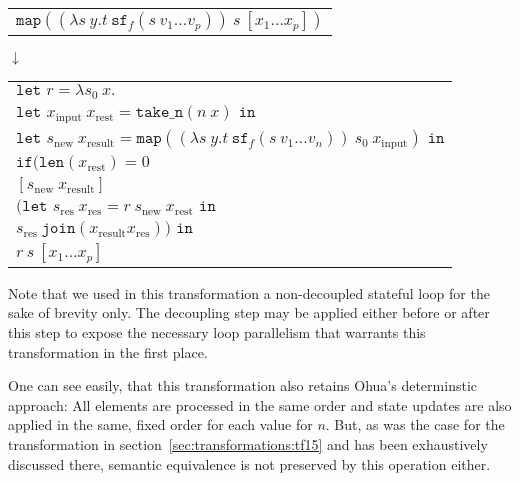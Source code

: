 \begin{center}
    \begin{tabular}{l}
        $\texttt{map} ((\lambda s\ y.t\ \texttt{sf}_f(s\ v_1 \dots v_p))\ s\ [x_1 \dots x_p])$\\
    \end{tabular}

    $\downarrow$

    \begin{tabular}{l}
        $\texttt{let } r = \lambda s_0\ x.$\\
        \hspace*{.3cm}$\texttt{let } x_\text{input}\ x_\text{rest} = \texttt{take\_n}( n\ x) \texttt{ in}$\\
        \hspace*{.6cm}$\texttt{let } s_\text{new}\ x_\text{result} = \texttt{map} ((\lambda s\ y.t\ \texttt{sf}_f(s\ v_1 \dots v_n))\ s_0 \ x_\text{input}) \texttt{ in}$\\
        \hspace*{.9cm}$\texttt{if} (\texttt{len} (x_\text{rest}) = 0$\\
        \hspace*{1.5cm}$[s_\text{new}\ x_\text{result}]$\\
        \hspace*{1.5cm}$(\texttt{let } s_\text{res}\ x_\text{res} = r\ s_\text{new} \ x_\text{rest} \texttt{ in}$\\
        \hspace*{1.8cm}$s_\text{res}\ \texttt{join} (x_\text{result} x_\text{res})) \texttt{ in}$\\
        \hspace*{.3cm}$r \ s \ [x_1 \dots x_p]$
    \end{tabular}
\end{center}

Note that we used in this transformation a non-decoupled stateful loop for the sake of brevity only.
The decoupling step may be applied either before or after this step to expose the necessary loop parallelism that warrants this transformation in the first place.

One can see easily, that this transformation also retains Ohua's determinstic approach: All elements are processed in the same order and state updates are also applied in the same, fixed order for each value for $n$.
But, as was the case for the transformation in section~\ref{sec:transformations:tf15} and has been exhaustively discussed there, semantic equivalence is not preserved by this operation either.

